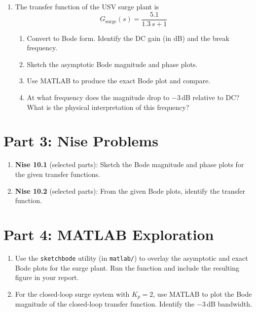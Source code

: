 \documentclass[11pt]{article}
\begin{document}
\begin{enumerate}[resume]

\item The transfer function of the USV surge plant is
  \[
    G_{\mathrm{surge}}(s) = \frac{5.1}{1.3\,s + 1}
  \]
  \begin{enumerate}
    \item Convert to Bode form.  Identify the DC gain (in dB) and the break
      frequency.
    \item Sketch the asymptotic Bode magnitude and phase plots.
    \item Use MATLAB to produce the exact Bode plot and compare.
    \item At what frequency does the magnitude drop to $-3$\,dB relative to DC?
      What is the physical interpretation of this frequency?
  \end{enumerate}

\end{enumerate}

\section*{Part 3: Nise Problems}

\begin{enumerate}[resume]

\item \textbf{Nise 10.1} (selected parts): Sketch the Bode magnitude and phase
  plots for the given transfer functions.

\item \textbf{Nise 10.2} (selected parts): From the given Bode plots, identify
  the transfer function.

\end{enumerate}

\section*{Part 4: MATLAB Exploration}

\begin{enumerate}[resume]

\item Use the \texttt{sketchbode} utility (in \texttt{matlab/}) to overlay the
  asymptotic and exact Bode plots for the surge plant.  Run the function and
  include the resulting figure in your report.

\item For the closed-loop surge system with $K_p = 2$, use MATLAB to plot the
  Bode magnitude of the closed-loop transfer function.  Identify the
  $-3$\,dB bandwidth.

\end{enumerate}
\end{document}

